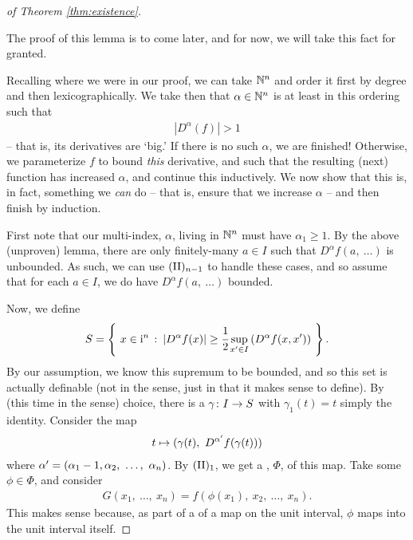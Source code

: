 \begin{proof}[of Theorem \ref{thm:existence}]
\begin{lemma}
      \label{lem:fin_a_unbounded}
    \end{lemma}

    The proof of this lemma is to come later, and for now, we will take this fact for granted.

    Recalling where we were in our proof, we can take $\N^n$ and order it first by degree and then lexicographically. We take then that $\alpha \in \N^n$ is at least in this ordering such that
      \begin{align*}
        \left\vert D^{\alpha}(f) \right\vert > 1
      \end{align*}
    -- that is, its derivatives are `big.' If there is no such $\alpha$, we are finished! Otherwise, we parameterize $f$ to bound \emph{this} derivative, and such that the resulting (next) function has increased $\alpha$, and continue this inductively. We now show that this is, in fact, something we \emph{can} do -- that is, ensure that we increase $\alpha$ -- and then finish by induction.

    First note that our multi-index, $\alpha$, living in $\N^n$ must have $\alpha_1 \geq 1$. By the above (unproven) lemma, there are only finitely-many $a \in I$ such that $D^{\alpha} f(a, \ \hdots)$ is unbounded. As such, we can use $\IIn[n-1]$ to handle these cases, and so assume that for each $a \in I$, we do have $D^{\alpha} f(a, \ \hdots)$ bounded.

    Now, we define
      \begin{align*}
        S = \left\{ \ x \in \I^n \ \colon \left\vert D^{\alpha} f(x) \right\vert \geq \cfrac{1}{2} \sup_{\pri{x} \in I} \left( D^{\alpha} f(x, \pri{x}) \right) \ \right\}.
      \end{align*}
    By our assumption, we know this supremum to be bounded, and so this set is actually definable (not in the \om sense, just in that it makes sense to define). By  (this time in the \om sense) choice, there is a  $\funcdom{\gamma}{I}{S}$ with $\gamma_1(t) = t$ simply the identity. Consider the map
      \begin{align*}
        t \mapsto (\gamma(t), \ D^{\pri{\alpha}} f (\gamma(t)))
      \end{align*}
    where $\pri{\alpha} = (\alpha_1 - 1, \alpha_2, \ \hdots, \ \alpha_n)$. By $\IIn[1]$, we get a \cellrparam, $\Phi$, of this map. Take some $\phi \in \Phi$, and consider
      \begin{align*}
        G(x_1, \ \hdots, \ x_n) = f(\phi(x_1), \ x_2, \ \hdots, \ x_n ).
      \end{align*}
    This makes sense because, as part of a \cellrparam of a map on the unit interval, $\phi$ maps into the unit interval itself.
    

\end{proof}
